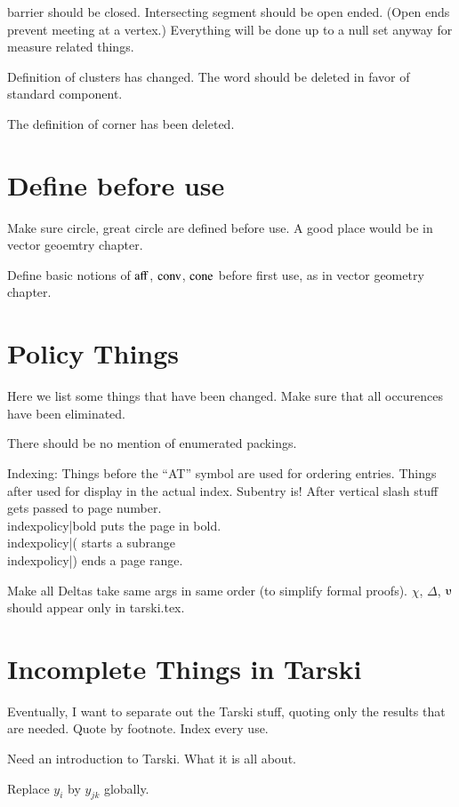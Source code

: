 barrier should be closed. Intersecting segment should be open ended.
(Open ends prevent meeting at a vertex.)
Everything will be done up to a null set
anyway for measure related things.

Definition of clusters has changed.  The word should be deleted
in favor of standard component.  

The definition of corner has been deleted.


\section{Define before use}

Make sure circle, great circle are defined before use.
A good place would be in vector geoemtry chapter.

Define basic notions of ${\operatorname{aff}}$, ${\operatorname{conv}}$, ${\operatorname{cone}}$
before first use, as in vector geometry chapter.


\section{Policy Things}

Here we list some things that have been changed.  Make sure that
all occurences have been eliminated.

There should be no mention of enumerated packings.

Indexing: Things before the ``AT'' symbol are used for ordering entries.
Things after used for display in the actual index.
Subentry is!  After vertical slash stuff gets passed to page
number.  \\index{policy|bold}  puts the page in bold.
\\index{policy|(} starts a subrange \\index{policy|)} ends a page range.

Make all Deltas take same args in same order (to simplify formal proofs).
$\chi$, $\Delta$, $\ups$ should appear only in tarski.tex. 

\section{Incomplete Things in Tarski}

Eventually, I want to separate out the Tarski stuff, quoting
only the results that are needed.  Quote by footnote. Index every use.

Need an introduction to Tarski. What it is all about.

Replace $y_i$ by $y_{jk}$ globally.


